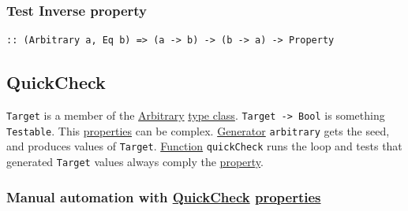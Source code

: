 \documentclass[a4paper,14pt,oneside]{book}
\begin{document}
\subsubsection{\label{orga81ed41}Test Inverse property}
\label{sec:org6c12c2f}
\begin{verbatim}
:: (Arbitrary a, Eq b) => (a -> b) -> (b -> a) -> Property
\end{verbatim}

\subsection{\label{org28f84b2}QuickCheck}
\label{sec:org5b1f1d9}
\texttt{Target} is a member of the \hyperref[org4807485]{Arbitrary} \hyperref[org0c695dc]{type class}.
\texttt{Target -> Bool} is something \texttt{Testable}. This \hyperref[org0be48bd]{properties} can be complex.
\hyperref[orga9ff459]{Generator} \texttt{arbitrary} gets the seed, and produces values of \texttt{Target}.
\hyperref[orgba4b145]{Function} \texttt{quickCheck} runs the loop and tests that generated \texttt{Target} values always comply the \hyperref[orgc961e31]{property}.

\subsubsection{Manual automation with \hyperref[org28f84b2]{QuickCheck} \hyperref[org0be48bd]{properties}}
\label{sec:orgb794405}
\end{document}
